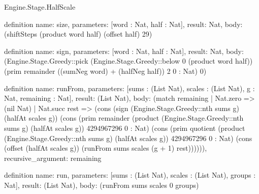 \begin{lexlean}{Engine.Stage.HalfScale}
\begin{semanticmodule}
definition{
  name: size,
  parameters: [word : Nat, half : Nat],
  result: Nat,
  body: (shiftSteps (product word half) (offset half) 29)
}

definition{
  name: sign,
  parameters: [word : Nat, half : Nat],
  result: Nat,
  body: (Engine.Stage.Greedy::pick (Engine.Stage.Greedy::below 0 (product word half)) (prim remainder ((sumNeg word) + (halfNeg half)) 2 0 : Nat) 0)
}

definition{
  name: runFrom,
  parameters: [sums : (List Nat), scales : (List Nat), g : Nat, remaining : Nat],
  result: (List Nat),
  body: (match remaining
    | Nat.zero => (nil Nat)
    | Nat.succ rest => (cons (sign (Engine.Stage.Greedy::nth sums g) (halfAt scales g)) (cons (prim remainder (product (Engine.Stage.Greedy::nth sums g) (halfAt scales g)) 4294967296 0 : Nat) (cons (prim quotient (product (Engine.Stage.Greedy::nth sums g) (halfAt scales g)) 4294967296 0 : Nat) (cons (offset (halfAt scales g)) (runFrom sums scales (g + 1) rest)))))),
  recursive_argument: remaining
}

definition{
  name: run,
  parameters: [sums : (List Nat), scales : (List Nat), groups : Nat],
  result: (List Nat),
  body: (runFrom sums scales 0 groups)
}
\end{semanticmodule}
\end{lexlean}
